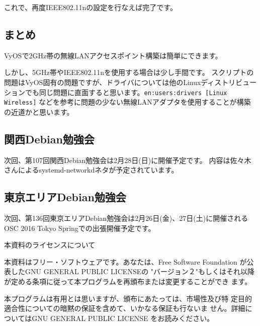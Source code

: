 \documentclass[mingoth,a4paper]{jsarticle}
\begin{document}
これで、再度IEEE802.11nの設定を行なえば完了です。

\subsection{まとめ}

VyOSで2GHz帯の無線LANアクセスポイント構築は簡単にできます。

しかし、5GHz帯やIEEE802.11nを使用する場合は少し手間です。
スクリプトの問題はVyOS固有の問題ですが、ドライバについては他のLinuxディストリビュー
ションでも同じ問題に直面すると思います。{\tt en:users:drivers [Linux Wireless]}
などを参考に問題の少ない無線LANアダプタを使用することが構築の近道かと思います。



\subsection{関西Debian勉強会}
次回、第107回関西Debian勉強会は2月28日(日)に開催予定です。
内容は佐々木さんによるsystemd-networkdネタが予定されています。

\subsection{東京エリアDebian勉強会}
次回、第136回東京エリアDebian勉強会は2月26日(金)、27日(土)に開催される
OSC 2016 Tokyo Springでの出張開催予定です。

%
\mbox{}\newpage
\mbox{}\newpage
\mbox{}\newpage

\pagebreak

\begin{center}
本資料のライセンスについて
\end{center}

本資料はフリー・ソフトウェアです。あなたは、Free Software
Foundation が公表したGNU GENERAL PUBLIC LICENSEの "バージョン２"もしくはそれ以降
が定める条項に従って本プログラムを再頒布または変更することができ
ます。

本プログラムは有用とは思いますが、頒布にあたっては、市場性及び特
定目的適合性についての暗黙の保証を含めて、いかなる保証も行ないま
せん。詳細についてはGNU GENERAL PUBLIC LICENSE をお読みください。
\end{document}
